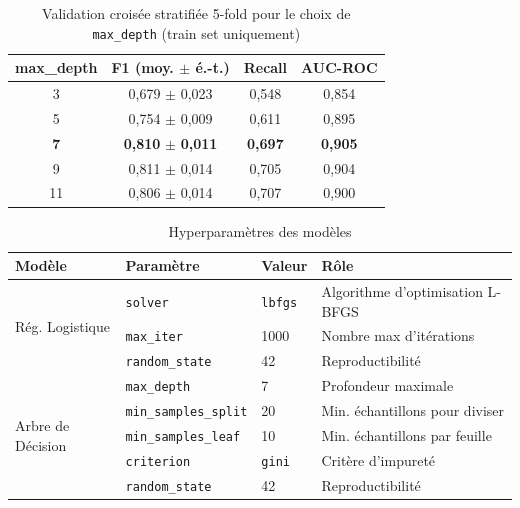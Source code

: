 \documentclass[12pt,a4paper,openany]{report}
\begin{document}
\begin{table}[H]
    \centering
    \caption{Validation croisée stratifiée 5-fold pour le choix de \texttt{max\_depth} (train set uniquement)}
    \label{tab:cv-depth}
    \begin{tabular}{c c c c}
        \toprule
        \textbf{max\_depth} & \textbf{F1 (moy. $\pm$ é.-t.)} & \textbf{Recall} & \textbf{AUC-ROC} \\
        \midrule
        3  & 0,679 $\pm$ 0,023 & 0,548 & 0,854 \\
        5  & 0,754 $\pm$ 0,009 & 0,611 & 0,895 \\
        \textbf{7}  & \textbf{0,810} $\pm$ \textbf{0,011} & \textbf{0,697} & \textbf{0,905} \\
        9  & 0,811 $\pm$ 0,014 & 0,705 & 0,904 \\
        11 & 0,806 $\pm$ 0,014 & 0,707 & 0,900 \\
        \bottomrule
    \end{tabular}
\end{table}

\begin{table}[H]
    \centering
    \small
    \caption{Hyperparamètres des modèles}
    \label{tab:hyperparams}
    \begin{tabularx}{\textwidth}{l l l X}
        \toprule
        \textbf{Modèle} & \textbf{Paramètre} & \textbf{Valeur} & \textbf{Rôle} \\
        \midrule
        \multirow{3}{*}{Rég. Logistique}
            & \texttt{solver}       & \texttt{lbfgs} & Algorithme d'optimisation L-BFGS \\
            & \texttt{max\_iter}    & 1000           & Nombre max d'itérations \\
            & \texttt{random\_state}& 42             & Reproductibilité \\
        \midrule
        \multirow{5}{*}{Arbre de Décision}
            & \texttt{max\_depth}          & 7      & Profondeur maximale \\
            & \texttt{min\_samples\_split} & 20     & Min. échantillons pour diviser \\
            & \texttt{min\_samples\_leaf}  & 10     & Min. échantillons par feuille \\
            & \texttt{criterion}           & \texttt{gini} & Critère d'impureté \\
            & \texttt{random\_state}       & 42     & Reproductibilité \\
        \bottomrule
    \end{tabularx}
\end{table}
\end{document}
